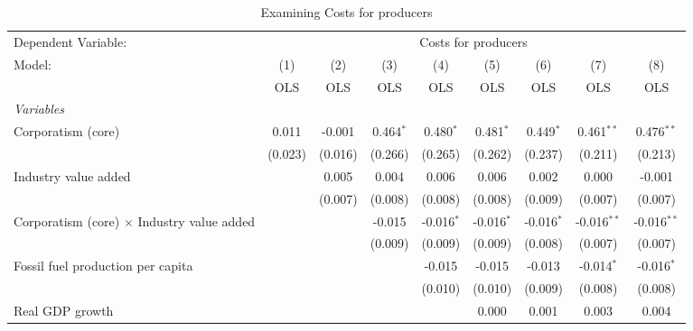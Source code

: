 
\begin{table}[htbp]
   \caption{Examining Costs for producers}
   \centering
   \begin{tabular}{lcccccccc}
      \toprule
      Dependent Variable: & \multicolumn{8}{c}{Costs for producers}\\
      Model:                                            & (1)     & (2)     & (3)         & (4)          & (5)          & (6)          & (7)           & (8)\\  
                                                        &  OLS    & OLS     & OLS         & OLS          & OLS          & OLS          & OLS           & OLS\\  
      \midrule
      \emph{Variables}\\
      Corporatism (core)                                & 0.011   & -0.001  & 0.464$^{*}$ & 0.480$^{*}$  & 0.481$^{*}$  & 0.449$^{*}$  & 0.461$^{**}$  & 0.476$^{**}$\\   
                                                        & (0.023) & (0.016) & (0.266)     & (0.265)      & (0.262)      & (0.237)      & (0.211)       & (0.213)\\   
      Industry value added                              &         & 0.005   & 0.004       & 0.006        & 0.006        & 0.002        & 0.000         & -0.001\\   
                                                        &         & (0.007) & (0.008)     & (0.008)      & (0.008)      & (0.009)      & (0.007)       & (0.007)\\   
      Corporatism (core) $\times$ Industry value added  &         &         & -0.015      & -0.016$^{*}$ & -0.016$^{*}$ & -0.016$^{*}$ & -0.016$^{**}$ & -0.016$^{**}$\\   
                                                        &         &         & (0.009)     & (0.009)      & (0.009)      & (0.008)      & (0.007)       & (0.007)\\   
      Fossil fuel production per capita                 &         &         &             & -0.015       & -0.015       & -0.013       & -0.014$^{*}$  & -0.016$^{*}$\\   
                                                        &         &         &             & (0.010)      & (0.010)      & (0.009)      & (0.008)       & (0.008)\\   
      Real GDP growth                                   &         &         &             &              & 0.000        & 0.001        & 0.003         & 0.004\\   

\end{tabular}
\end{table}

